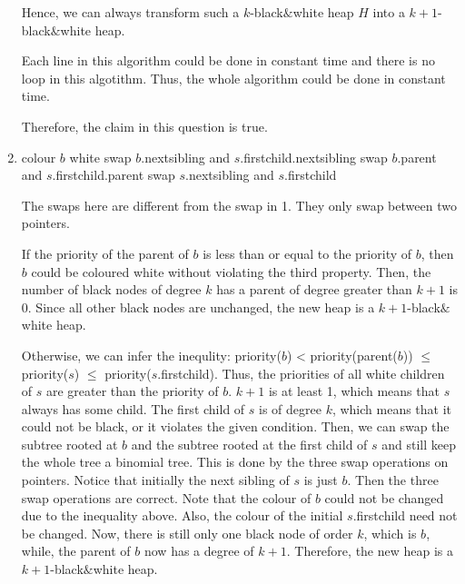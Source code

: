 \documentclass[10pt]{article}
\begin{document}
\begin{enumerate}
		Hence, we can always transform such a $k$-black$\&$white heap $H$ into a
		$k+1$-black$\&$white heap.

		Each line in this algorithm could be done in constant time and there is
		no loop in this algotithm.
		Thus, the whole algorithm could be done in constant time.

		Therefore, the claim in this question is true.

	\item
	\begin{comment}
		Suppose you have a linked-list H of binomial trees that satisfies all
		the properties of a black$&$white heap except that it has one black node
		$b$ of degree $k$ and its parent has degree greater than $k+1$.
		Suppose that the sibling $s$ of degree $k+1$ of $b$ is white.
		Given pointers to $b$ and $s$, explain how to transform H in constant
		time into a k'-black$&$white heap with the same set of nodes, for some
		$k' > k$.
	\end{comment}

		\begin{algorithmic}[1]
				\State colour $b$ white
			\Else
				\State swap $b$.nextsibling and $s$.firstchild.nextsibling
				\State swap $b$.parent and $s$.firstchild.parent
				\State swap $s$.nextsibling and $s$.firstchild
			\EndIf
		\end{algorithmic}

		The swaps here are different from the swap in 1.
		They only swap between two pointers.

		If the priority of the parent of $b$ is less than or equal to the
		priority of $b$, then $b$ could be coloured white without violating the
		third property.
		Then, the number of black nodes of degree $k$ has a parent of degree
		greater than $k+1$ is 0.
		Since all other black nodes are unchanged, the new heap is a
		$k+1$-black$\&$white heap.

		Otherwise, we can infer the inequlity: priority($b$) <
		priority(parent($b$)) $\leq$ priority($s$) $\leq$
		priority($s$.firstchild).
		Thus, the priorities of all white children of $s$ are greater than the
		priority of $b$.
		$k+1$ is at least 1, which means that $s$ always has some child.
		The first child of $s$ is of degree $k$, which means that it could not
		be black, or it violates the given condition. 
		Then, we can swap the subtree rooted at $b$ and the subtree rooted at
		the first child of $s$ and still keep the whole tree a binomial tree. 
		This is done by the three swap operations on pointers. 
		Notice that initially the next sibling of $s$ is just $b$.
		Then the three swap operations are correct.
		Note that the colour of $b$ could not be changed due to the inequality
		above.
		Also, the colour of the initial $s$.firstchild need not be changed.
		Now, there is still only one black node of order $k$, which is $b$,
		while, the parent of $b$ now has a degree of $k+1$.
		Therefore, the new heap is a $k+1$-black$\&$white heap.


\end{enumerate}
\end{document}
